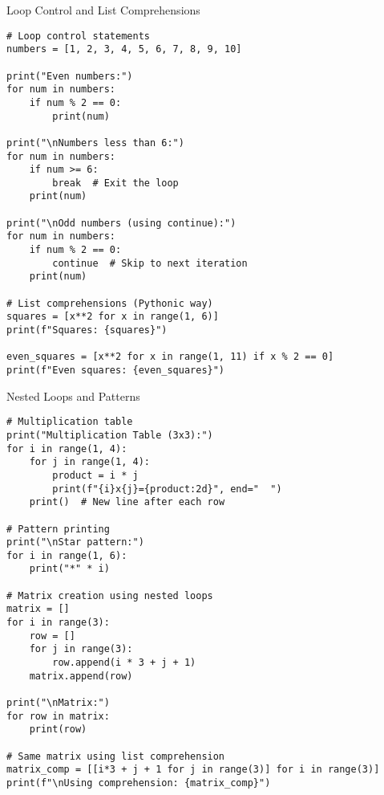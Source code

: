 \begin{frame}[fragile]{Loop Control and List Comprehensions}
    \begin{codeblock}
        \begin{lstlisting}
# Loop control statements
numbers = [1, 2, 3, 4, 5, 6, 7, 8, 9, 10]

print("Even numbers:")
for num in numbers:
    if num % 2 == 0:
        print(num)
    
print("\nNumbers less than 6:")
for num in numbers:
    if num >= 6:
        break  # Exit the loop
    print(num)

print("\nOdd numbers (using continue):")
for num in numbers:
    if num % 2 == 0:
        continue  # Skip to next iteration
    print(num)

# List comprehensions (Pythonic way)
squares = [x**2 for x in range(1, 6)]
print(f"Squares: {squares}")

even_squares = [x**2 for x in range(1, 11) if x % 2 == 0]
print(f"Even squares: {even_squares}")
        \end{lstlisting}
    \end{codeblock}
\end{frame}

\begin{frame}[fragile]{Nested Loops and Patterns}
    \begin{codeblock}
        \begin{lstlisting}
# Multiplication table
print("Multiplication Table (3x3):")
for i in range(1, 4):
    for j in range(1, 4):
        product = i * j
        print(f"{i}x{j}={product:2d}", end="  ")
    print()  # New line after each row

# Pattern printing
print("\nStar pattern:")
for i in range(1, 6):
    print("*" * i)

# Matrix creation using nested loops
matrix = []
for i in range(3):
    row = []
    for j in range(3):
        row.append(i * 3 + j + 1)
    matrix.append(row)

print("\nMatrix:")
for row in matrix:
    print(row)

# Same matrix using list comprehension
matrix_comp = [[i*3 + j + 1 for j in range(3)] for i in range(3)]
print(f"\nUsing comprehension: {matrix_comp}")
        \end{lstlisting}
    \end{codeblock}
\end{frame}

